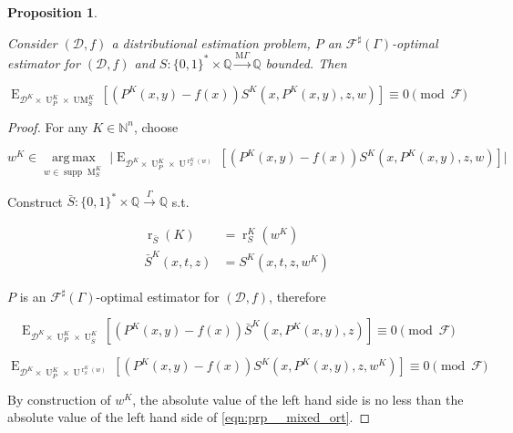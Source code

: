 \documentclass[11pt]{article}
\numberwithin{equation}{section}
\theoremstyle{definition}
\theoremstyle{plain}
\newtheorem{proposition}{Proposition}[section]
\newcommand{\Bool}{\{0,1\}}
\newcommand{\Words}{{\Bool^*}}
\DeclareMathOperator{\Supp}{supp}
\DeclareMathOperator{\E}{E}
\DeclareMathOperator{\R}{r}
\DeclareMathOperator{\M}{M}
\DeclareMathOperator{\UM}{UM}
\DeclareMathOperator{\Un}{U}
\newcommand{\Argmax}[1]{\underset{#1}{\operatorname{arg\,max}}\,}
\newcommand{\Nats}{\mathbb{N}}
\newcommand{\Rats}{\mathbb{Q}}
\newcommand{\Abs}[1]{\lvert #1 \rvert}
\newcommand{\Dist}{\mathcal{D}}
\newcommand{\MGrow}{\mathrm{M}\Gamma}
\newcommand{\Fall}{\mathcal{F}}
\newcommand{\ESG}{\Fall^\sharp(\Gamma)}
\newcommand{\Scheme}{\xrightarrow{\Gamma}}
\newcommand{\MScheme}{\xrightarrow{\MGrow}}
\begin{document}
\begin{samepage}
\begin{proposition}
\label{prp:mixed_ort}

Consider $(\Dist,f)$ a distributional estimation problem, $P$ an $\ESG$-optimal estimator for $(\Dist,f)$ and $S: \Words \times \Rats \MScheme \Rats$ bounded. Then

\begin{equation}
\label{eqn:prp__mixed_ort}
\E_{\Dist^{K} \times \Un_P^{K} \times \UM_S^{K}}[(P^{K}(x,y) - f(x))S^{K}(x,P^{K}(x,y),z,w)] \equiv 0 \pmod \Fall
\end{equation}

\end{proposition}
\end{samepage}

\begin{proof}

For any $K \in \Nats^n$, choose 

$$w^{K} \in \Argmax{w \in \Supp \M_S^{K}} \Abs{\E_{\Dist^{K} \times \Un_P^{K} \times \Un^{\R_S^{K}(w)}}[(P^{K}(x,y) - f(x))S^{K}(x,P^{K}(x,y),z,w)]}$$

Construct $\bar{S}: \Words \times \Rats \Scheme \Rats$ s.t. 

\begin{align*}
\R_{\bar{S}}(K)&=\R_S^{K}(w^{K}) \\
\bar{S}^{K}(x,t,z)&=S^{K}(x,t,z,w^{K})
\end{align*}

$P$ is an $\ESG$-optimal estimator for $(\Dist,f)$, therefore

$$\E_{\Dist^{K} \times \Un_P^{K} \times \Un_{\bar{S}}^{K}}[(P^{K}(x,y) - f(x))\bar{S}^{K}(x,P^{K}(x,y),z)] \equiv 0 \pmod \Fall$$

$$\E_{\Dist^{K} \times \Un_P^{K} \times \Un^{\R_S^{K}(w)}}[(P^{K}(x,y) - f(x))S^{K}(x,P^{K}(x,y),z,w^{K})] \equiv 0 \pmod \Fall$$

By construction of $w^{K}$, the absolute value of the left hand side is no less than the absolute value of the left hand side of \ref{eqn:prp__mixed_ort}.
\end{proof}
\end{document}
